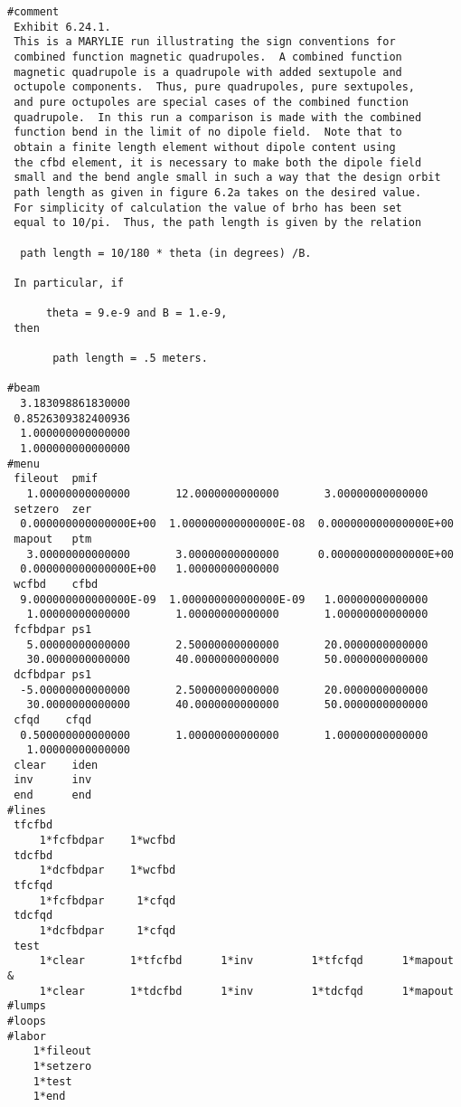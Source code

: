 \clearpage
\begin{footnotesize}
\begin{verbatim}
#comment
 Exhibit 6.24.1.
 This is a MARYLIE run illustrating the sign conventions for
 combined function magnetic quadrupoles.  A combined function
 magnetic quadrupole is a quadrupole with added sextupole and
 octupole components.  Thus, pure quadrupoles, pure sextupoles,
 and pure octupoles are special cases of the combined function
 quadrupole.  In this run a comparison is made with the combined
 function bend in the limit of no dipole field.  Note that to
 obtain a finite length element without dipole content using
 the cfbd element, it is necessary to make both the dipole field
 small and the bend angle small in such a way that the design orbit
 path length as given in figure 6.2a takes on the desired value.
 For simplicity of calculation the value of brho has been set
 equal to 10/pi.  Thus, the path length is given by the relation

  path length = 10/180 * theta (in degrees) /B.

 In particular, if

      theta = 9.e-9 and B = 1.e-9,
 then

       path length = .5 meters.

#beam
  3.183098861830000
 0.8526309382400936
  1.000000000000000
  1.000000000000000
#menu
 fileout  pmif
   1.00000000000000       12.0000000000000       3.00000000000000
 setzero  zer
  0.000000000000000E+00  1.000000000000000E-08  0.000000000000000E+00
 mapout   ptm
   3.00000000000000       3.00000000000000      0.000000000000000E+00
  0.000000000000000E+00   1.00000000000000
 wcfbd    cfbd
  9.000000000000000E-09  1.000000000000000E-09   1.00000000000000
   1.00000000000000       1.00000000000000       1.00000000000000
 fcfbdpar ps1
   5.00000000000000       2.50000000000000       20.0000000000000
   30.0000000000000       40.0000000000000       50.0000000000000
 dcfbdpar ps1
  -5.00000000000000       2.50000000000000       20.0000000000000
   30.0000000000000       40.0000000000000       50.0000000000000
 cfqd    cfqd
  0.500000000000000       1.00000000000000       1.00000000000000
   1.00000000000000
 clear    iden
 inv      inv
 end      end
#lines
 tfcfbd
     1*fcfbdpar    1*wcfbd
 tdcfbd
     1*dcfbdpar    1*wcfbd
 tfcfqd
     1*fcfbdpar     1*cfqd
 tdcfqd
     1*dcfbdpar     1*cfqd
 test
     1*clear       1*tfcfbd      1*inv         1*tfcfqd      1*mapout   &
     1*clear       1*tdcfbd      1*inv         1*tdcfqd      1*mapout
#lumps
#loops
#labor
    1*fileout
    1*setzero
    1*test
    1*end
\end{verbatim}
\end{footnotesize}
